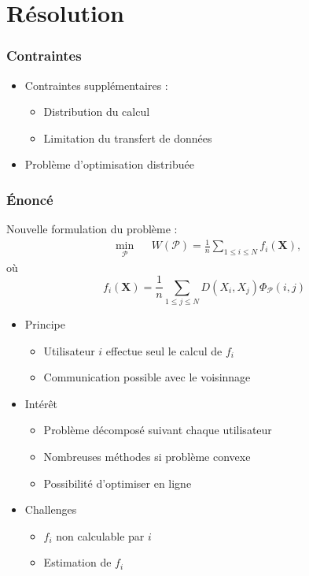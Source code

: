 \documentclass[c]{beamer}
\begin{document}
\section{Résolution}
\begin{frame}
    \frametitle{Contraintes}

    \begin{itemize}
        \item Contraintes supplémentaires :
        \begin{itemize}
            \item Distribution du calcul
            \item Limitation du transfert de données
        \end{itemize}
    
        \item Problème d'optimisation distribuée
    \end{itemize}

\end{frame}

\begin{frame}
    \frametitle{Énoncé}

    Nouvelle formulation du problème :
    \[
        \begin{aligned}
            & \min_{\mathcal{P}}
            && W\left(\mathcal{P} \right)
            = \frac{1}{n} \sum_{1 \leq i \leq N} f_i(\mathbf{X}),
        \end{aligned}
    \]
    où
    \[
        f_i(\mathbf{X}) = \frac{1}{n} \sum_{1 \leq j \leq N} D(X_i, X_j) \Phi_{\mathcal{P}}(i, j)
    \]
\end{frame}

\begin{frame}

    \begin{itemize}
        \item Principe
            \begin{itemize}
            \item Utilisateur $i$ effectue seul le calcul de $f_i$
            \item Communication possible avec le voisinnage
            \end{itemize}
        \item Intérêt
            \begin{itemize}
                    \item Problème décomposé suivant chaque utilisateur
                    \item Nombreuses méthodes si problème convexe
                    \item Possibilité d'optimiser en ligne
            \end{itemize}
        \item Challenges
            \begin{itemize}
                \item $f_i$ non calculable par $i$
                \item Estimation de $f_i$
            \end{itemize}
    \end{itemize}

\end{frame}
\end{document}
